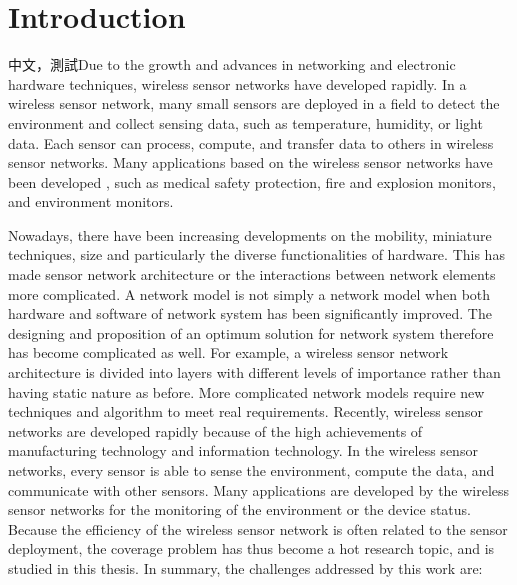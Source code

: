 
\chapter{Introduction} \label{introduction}

中文，測試Due to the growth and advances in networking and electronic hardware
techniques, wireless sensor networks have developed rapidly. In a
wireless sensor network, many small sensors are deployed in a field
to detect the environment and collect sensing data, such as
temperature, humidity, or light data. Each sensor can process,
compute, and transfer data to others in wireless sensor networks.
Many applications based on the wireless sensor networks have been
developed \cite{5705791,5706178,1607984,6421447,7110295,Hammoudi2008343}, such as
medical safety protection, fire and explosion monitors, and
environment monitors.

Nowadays, there have been increasing developments on
the mobility, miniature techniques, size and particularly the diverse
functionalities of hardware. This has made sensor network architecture or the
interactions between network elements more complicated. A
network model is not simply a network model when both hardware
and software of network system has been significantly improved. The designing
and proposition of an optimum solution for network system therefore has
become complicated as well. For example, a wireless sensor network architecture is divided into
layers with different levels of importance rather than having static nature as before.
More complicated network models require new techniques and algorithm to meet real requirements.
Recently, wireless sensor networks are developed rapidly because of
the high achievements of manufacturing technology and information
technology. In the wireless sensor networks, every sensor is able to
sense the environment, compute the data, and communicate with other
sensors. Many applications are developed by the wireless sensor
networks for the monitoring of the environment or the device status.
Because the efficiency of the wireless sensor
network is often related to the sensor deployment, the coverage
problem has thus become a hot research topic, and is studied in this
thesis. In summary, the challenges addressed by this work are:


